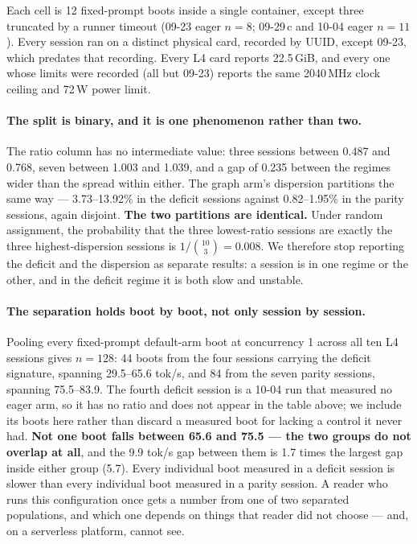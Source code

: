 \documentclass[11pt]{article}
\begin{document}
Each cell is 12 fixed-prompt boots inside a single container, except three
truncated by a runner timeout (09-23 eager $n=8$; 09-29\,c and 10-04 eager
$n=11$). Every session ran on a distinct physical card, recorded by UUID,
except 09-23, which predates that recording. Every L4 card reports
22.5\,GiB, and every one whose limits were recorded (all but 09-23) reports
the same 2040\,MHz clock ceiling and 72\,W power limit.

\paragraph{The split is binary, and it is one phenomenon rather than two.}
The ratio column has no intermediate value: three sessions between 0.487 and
0.768, seven between 1.003 and 1.039, and a gap of 0.235 between the regimes
wider than the spread within either. The graph arm's dispersion partitions
the same way --- 3.73--13.92\% in the deficit sessions against 0.82--1.95\%
in the parity sessions, again disjoint. \textbf{The two partitions are
identical.} Under random assignment, the probability that the three
lowest-ratio sessions are exactly the three highest-dispersion sessions is
$1/\binom{10}{3} = 0.008$. We therefore stop reporting the deficit and the
dispersion as separate results: a session is in one regime or the other, and
in the deficit regime it is both slow and unstable.

\paragraph{The separation holds boot by boot, not only session by session.}
Pooling every fixed-prompt default-arm boot at concurrency 1 across all ten
L4 sessions gives $n = 128$: 44 boots from the four sessions carrying the
deficit signature, spanning 29.5--65.6 tok/s, and 84 from the seven parity
sessions, spanning 75.5--83.9. The fourth deficit session is a 10-04 run that
measured no eager arm, so it has no ratio and does not appear in the table
above; we include its boots here rather than discard a measured boot for
lacking a control it never had. \textbf{Not one boot falls between 65.6 and
75.5 --- the two groups do not overlap at all}, and the 9.9 tok/s gap between
them is 1.7 times the largest gap inside either group (5.7). Every individual
boot measured in a deficit session is slower than every individual boot
measured in a parity session. A reader who runs this
configuration once gets a number from one of two separated populations,
and which one depends on things that reader did not choose --- and, on a
serverless platform, cannot see.
\end{document}
